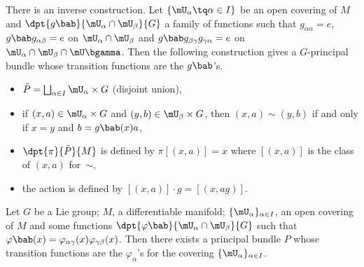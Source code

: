 There is an inverse construction. Let $\{\mU_{\alpha}\tq\alpha\in I\}$ be an open covering of $M$ and $\dpt{g\bab}{\mU_{\alpha}\cap\mU_{\beta}}{G}$ a family of functions such that $g_{\alpha\alpha}=e$, $g\bab g_{\alpha\beta}=e$ on $\mU_{\alpha}\cap\mU_{\beta}$ and $g\bab g_{\beta\gamma}g_{\gamma\alpha}=e$ on $\mU_{\alpha}\cap\mU_{\beta}\cap\mU\bgamma$. Then the following construction gives a $G$-principal bundle whose transition functions are the $g\bab$'s.

\begin{itemize}
\item $\tilde{P}=\bigsqcup_{\alpha\in I}\mU_{\alpha}\times G$  (disjoint union),
\item if $(x,a)\in\mU_{\alpha}\times G$ and $(y,b)\in\mU_{\beta}\times G$, then $(x,a)\sim(y,b)$ if and only if $x=y$ and $b=g\bab(x)a$, 
\item $\dpt{\pi}{\tilde{P}}{M}$ is defined by $\pi[(x,a)]=x$ where $[(x,a)]$ is the class of $(x,a)$ for~$\sim$,
\item the action is defined by $[(x,a)]\cdot g=[(x,ag)]$.
\end{itemize}

\begin{theorem}
Let $G$ be a Lie group; $M$, a differentiable manifold; $\{\mU_{\alpha}\}_{\alpha\in I}$, an open covering of $M$ and some functions $\dpt{\varphi\bab}{\mU_{\alpha}\cap\mU_{\beta}}{G}$ such that $\varphi\bab(x)=\varphi_{\alpha\gamma}(x)\varphi_{\gamma\beta}(x)$. Then there exists a principal bundle $P$ whose transition functions are the $\varphi_{\alpha}$'s for the covering $\{\mU_{\alpha}\}_{\alpha\in I}$.
\end{theorem}

